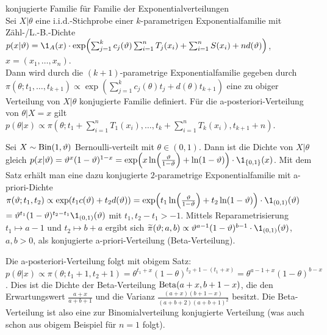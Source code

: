 \begin{Satz}{konjugierte Familie für Familie der Exponentialverteilungen}\\
    Sei $X|\theta$ eine i.i.d.-Stichprobe einer $k$-parametrigen Exponentialfamilie mit
    Zähl-/L.-B.-Dichte\\
    $p(x|\theta) = \1_A(x) \cdot \exp\!\left(\sum_{j=1}^k c_j(\theta)
    \sum_{i=1}^n T_j(x_i) + \sum_{i=1}^n S(x_i) + n d(\theta)\right)$, $x = (x_1, \dotsc, x_n)$.\\
    Dann wird durch die $(k + 1)$-parametrige Exponentialfamilie gegeben durch\\
    $\pi(\theta; t_1, \dotsc, t_{k+1}) \propto
    \exp\!\left(\sum_{j=1}^k c_j(\theta) t_j + d(\theta) t_{k+1}\right)$
    eine zu obiger Verteilung von $X|\theta$ konjugierte Familie definiert.
    Für die a-posteriori-Verteilung von $\theta|X = x$ gilt\\
    $p(\theta|x) \propto \pi\!\left(\theta; t_1 + \sum_{i=1}^n T_1(x_i), \dotsc,
    t_k + \sum_{i=1}^n T_k(x_i), t_{k+1} + n\right)$.
\end{Satz}

\linie

\begin{Bsp}
    Sei $X \sim \operatorname{Bin}(1, \vartheta)$ Bernoulli-verteilt mit $\theta \in (0, 1)$.
    Dann ist die Dichte von $X|\theta$ gleich
    $p(x|\theta) = \theta^x (1 - \theta)^{1-x} =
    \exp\!\left(x \ln\!\left(\frac{\theta}{1-\theta}\right) + \ln(1 - \theta)\right)
    \cdot \1_{\{0, 1\}}(x)$.
    Mit dem Satz erhält man eine dazu konjugierte $2$-parametrige Exponentialfamilie mit
    a-priori-Dichte\\
    $\pi(\theta; t_1, t_2) \propto \exp(t_1 c(\theta) + t_2 d(\theta))
    = \exp\!\left(t_1 \ln\!\left(\frac{\theta}{1 - \theta}\right) + t_2 \ln(1 - \theta)\right) \cdot
    \1_{(0,1)}(\theta)$\\
    $= \theta^{t_1} (1 - \theta)^{t_2 - t_1} \1_{(0, 1)}(\theta)$
    mit $t_1, t_2 - t_1 > -1$.
    Mittels Reparametrisierung $t_1 \mapsto a - 1$ und $t_2 \mapsto b + a$
    ergibt sich $\widetilde{\pi}(\theta; a, b) \propto
    \vartheta^{a-1} (1 - \vartheta)^{b-1} \cdot \1_{(0,1)}(\theta)$, $a, b > 0$,
    als konjugierte a-priori-Verteilung (Beta-Verteilung).

    Die a-posteriori-Verteilung folgt mit obigem Satz:
    $p(\theta|x) \propto \pi(\theta; t_1 + 1, t_2 + 1)
    = \theta^{t_1+x} (1 - \theta)^{t_2 + 1 - (t_1 + x)} = \theta^{a-1+x} (1 - \theta)^{b-x}$.
    Dies ist die Dichte der Beta-Verteilung $\operatorname{Beta}(a+x, b+1-x)$,
    die den Erwartungswert $\frac{a+x}{a+b+1}$ und die Varianz
    $\frac{(a+x)(b+1-x)}{(a+b+2)(a+b+1)^2}$ besitzt.
    Die Beta-Verteilung ist also eine zur Binomialverteilung konjugierte Verteilung
    (was auch schon aus obigem Beispiel für $n = 1$ folgt).
\end{Bsp}

